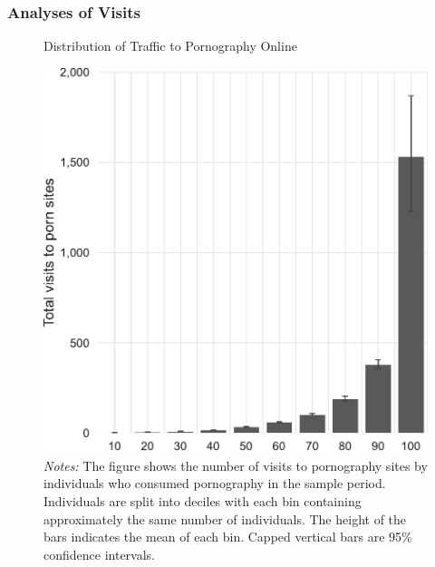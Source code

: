\documentclass[12pt, letterpaper]{article}
\begin{document}
\subsubsection{Analyses of Visits}
\label{si:visits}
\begin{figure}[ht]
	\centering
	\caption{Distribution of Traffic to Pornography Online}
	\includegraphics[width=.5\linewidth]{figs/distribution_visits_to_adultsites.pdf}
	\caption*{\footnotesize \emph{Notes:} 
		The figure shows the number of visits to pornography sites by individuals who consumed pornography in the sample period.
		Individuals are split into deciles with each bin containing approximately the same number of individuals.
		The height of the bars indicates the mean of each bin.
		Capped vertical bars are 95\% confidence intervals.
	}
	\label{fig:distribution_visits}
\end{figure}
\end{document}
